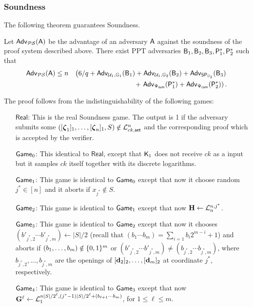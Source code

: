 \subsubsection{Soundness}

The following theorem guarantees Soundness. 
 
\begin{theorem} Let $\mathsf{Adv}_{\mathcal{PS}}(\mathsf{A})$ 
be the advantage of an adversary $\mathsf{A}$ against the soundness of 
the proof system  described above. There exist PPT adversaries
$\mathsf{B}_1,\mathsf{B}_2,\mathsf{B}_3,\mathsf{P}^*_1,\mathsf{P}^*_2$ such that 
\begin{eqnarray*}
\mathsf{Adv}_{\mathcal{PS}}(\mathsf{A}) & \leq 
n& \left(6/q+ \mathsf{Adv}_{\mathcal{U}_1,\mathbb{G}_1}(\mathsf{B}_1)
+  \mathsf{Adv}_{\mathcal{U}_1,\mathbb{G}_2}(\mathsf{B}_2)
+  \mathsf{Adv}_{\mathsf{SP}_{\mathbb{G}_2}}(\mathsf{B}_3)\right. \\
& & \mbox{ } 
+  \left.\mathsf{Adv}_{{\Psi_{\mathsf{sum}}}}(\mathsf{P}^*_1)
+
 \mathsf{Adv}_{{\Psi_{\mathsf{com}}}}(\mathsf{P}^*_2)\right).
\end{eqnarray*}
\label{teo:bitstr-soundness}
\end{theorem}

The proof follows from the indistinguishability of the following games:
\begin{itemize}
\item[$\mathsf{Real}$:] This is the real Soundness game. The output is 1 if the adversary submits some $([{\boldsymbol \zeta}_1]_1,\ldots,[{\boldsymbol \zeta}_n]_1,S)\notin\mathcal{L}_{ck,\mathsf{set}}^n$ and the corresponding proof which is accepted by the verifier.
\item[$\mathsf{Game}_0$:] This identical to $\mathsf{Real}$, except that $\mathsf{K}_1$ does not receive $ck$ as a input but
it samples $ck$ itself together with its discrete logarithms.
\item[$\mathsf{Game}_1$:] This game is identical to $\mathsf{Game}_0$ except that now it choose random $j^*\in[n]$ and it aborts if $x_{j^*}\notin S$.
\item[$\mathsf{Game}_2$:] This game is identical to $\mathsf{Game}_1$ except that now $\mathbf{{H}}\gets\mathcal{L}^{n,j^*}_n$.
\item[$\mathsf{Game}_3$:] This game is identical to $\mathsf{Game}_2$ except that now it chooses $(b'_{j^*,2}\cdots b'_{j^*,m})\gets |S|/2$ (recall that $(b_1\cdots b_m)=\sum_{i=1}b_i2^{m-i}+1$) and aborts if $(b_1,\ldots,b_m)\notin\{0,1\}^m$ or $(b'_{j^*,2}\cdots b'_{j^*,m})\neq(b_{j^*,2}\cdots b_{j^*,m})$, where $b_{j^*,2},\ldots,b_{j^*,m}$ are the openings of $[\mathbf{d}_2]_2,\ldots,[\mathbf{d}_m]_2$ at coordinate $j^*$, respectively.
\item[$\mathsf{Game}_4$:] This game is identical to $\mathsf{Game}_3$ except that now $\mathbf{{G}}^\ell\gets\mathcal{L}_1^{n|S|/2^\ell,(j^*-1)|S|/2^\ell+(b_{\ell+1}\cdots b_m)}$, for $1\leq\ell\leq m$.
\end{itemize}

